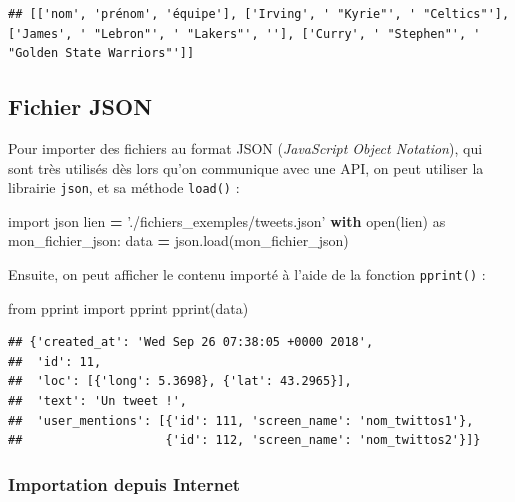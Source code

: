 \documentclass[12pt,]{book}
\newenvironment{Shaded}{\begin{snugshade}}{\end{snugshade}}
\newcommand{\StringTok}[1]{\textcolor[rgb]{0.31,0.60,0.02}{#1}}
\newcommand{\ImportTok}[1]{#1}
\newcommand{\ControlFlowTok}[1]{\textcolor[rgb]{0.13,0.29,0.53}{\textbf{#1}}}
\newcommand{\OperatorTok}[1]{\textcolor[rgb]{0.81,0.36,0.00}{\textbf{#1}}}
\newcommand{\BuiltInTok}[1]{#1}
\newcommand{\NormalTok}[1]{#1}
\numberwithin{equation}{section}
\numberwithin{countremarque}{section}
\begin{document}
\begin{lstlisting}
## [['nom', 'prénom', 'équipe'], ['Irving', ' "Kyrie"', ' "Celtics"'], ['James', ' "Lebron"', ' "Lakers"', ''], ['Curry', ' "Stephen"', ' "Golden State Warriors"']]
\end{lstlisting}

\subsection{Fichier JSON}\label{fichier-json}

Pour importer des fichiers au format JSON (\emph{JavaScript Object
Notation}), qui sont très utilisés dès lors qu'on communique avec une
API, on peut utiliser la librairie \texttt{json}, et sa méthode
\texttt{load()} :

\begin{Shaded}
\begin{Highlighting}[]
\ImportTok{import}\NormalTok{ json}
\NormalTok{lien }\OperatorTok{=} \StringTok{'./fichiers_exemples/tweets.json'}
\ControlFlowTok{with} \BuiltInTok{open}\NormalTok{(lien) }\ImportTok{as}\NormalTok{ mon_fichier_json:}
\NormalTok{    data }\OperatorTok{=}\NormalTok{ json.load(mon_fichier_json)}
\end{Highlighting}
\end{Shaded}

Ensuite, on peut afficher le contenu importé à l'aide de la fonction
\texttt{pprint()} :

\begin{Shaded}
\begin{Highlighting}[]
\ImportTok{from}\NormalTok{ pprint }\ImportTok{import}\NormalTok{ pprint}
\NormalTok{pprint(data)}
\end{Highlighting}
\end{Shaded}

\begin{lstlisting}
## {'created_at': 'Wed Sep 26 07:38:05 +0000 2018',
##  'id': 11,
##  'loc': [{'long': 5.3698}, {'lat': 43.2965}],
##  'text': 'Un tweet !',
##  'user_mentions': [{'id': 111, 'screen_name': 'nom_twittos1'},
##                    {'id': 112, 'screen_name': 'nom_twittos2'}]}
\end{lstlisting}

\subsubsection{Importation depuis
Internet}\label{importation-depuis-internet-2}
\end{document}
